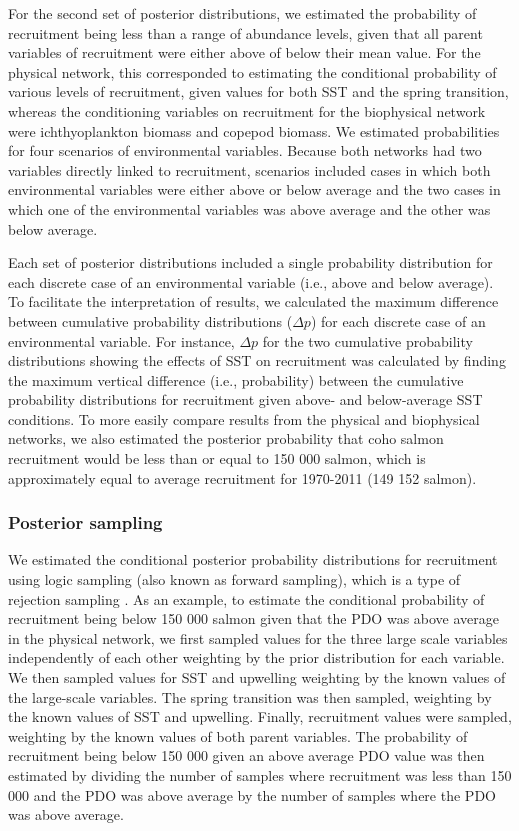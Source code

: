 For the second set of posterior distributions, we estimated the probability of
recruitment being less than a range of abundance levels, given that all parent
variables of recruitment were either above of below their mean value. For the
physical network, this corresponded to estimating the conditional probability of
various levels of recruitment, given values for both SST and the spring
transition, whereas the conditioning variables on recruitment for the
biophysical network were ichthyoplankton biomass and copepod biomass. We
estimated probabilities for four scenarios of environmental variables. Because
both networks had two variables directly linked to recruitment, scenarios
included cases in which both environmental variables were either above or below
average and the two cases in which one of the environmental variables was above
average and the other was below average.

Each set of posterior distributions included a single probability distribution
for each discrete case of an environmental variable (i.e., above and below
average). To facilitate the interpretation of results, we calculated the maximum
difference between cumulative probability distributions (\(\Delta p\)) for each
discrete case of an environmental variable. For instance, \(\Delta p\) for the
two cumulative probability distributions showing the effects of SST on
recruitment was calculated by finding the maximum vertical difference (i.e.,
probability) between the cumulative probability distributions for recruitment
given above- and below-average SST conditions. To more easily compare results
from the physical and biophysical networks, we also estimated the posterior
probability that coho salmon recruitment would be less than or equal to 150 000
salmon, which is approximately equal to average recruitment for 1970-2011 (149
152 salmon).


\subsubsection{Posterior sampling}

We estimated the conditional posterior probability distributions for recruitment
using logic sampling (also known as forward sampling), which is a type of
rejection sampling \citep{Henrion1988a, Korb2004a}. As an example, to estimate
the conditional probability of recruitment being below 150 000 salmon given that
the PDO was above average in the physical network, we first sampled values for
the three large scale variables independently of each other weighting by the
prior distribution for each variable. We then sampled values for SST and
upwelling weighting by the known values of the large-scale variables.  The
spring transition was then sampled, weighting by the known values of SST and
upwelling. Finally, recruitment values were sampled, weighting by the known
values of both parent variables. The probability of recruitment being below 150
000 given an above average PDO value was then estimated by dividing the number
of samples where recruitment was less than 150 000 and the PDO was above average
by the number of samples where the PDO was above average.

